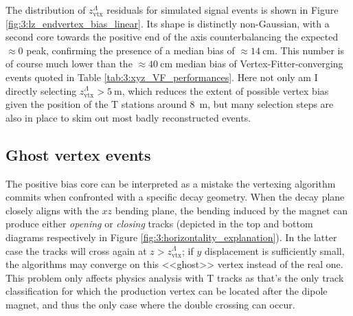 The distribution of $z_\text{vtx}^\Lambda$ residuals for simulated signal events is shown in Figure \ref{fig:3:lz_endvertex_bias_linear}.
Its shape is distinctly non-Gaussian, with a second core towards the positive end of the axis counterbalancing the expected $\approx 0$ peak, confirming the presence of a median bias of $\approx \SI{14}{\centi\meter}$. This number is of course much lower than the $\approx \SI{40}{\centi\meter}$ median bias of Vertex-Fitter-converging events quoted in Table \ref{tab:3:xyz_VF_performances}. Here not only am I directly selecting $z_\text{vtx}^\Lambda > \SI{5}{\meter}$, which reduces the extent of possible vertex bias given the position of the T stations around \SI{8}{\meter}, but many selection steps are also in place to skim out most badly reconstructed events.

\subsection{Ghost vertex events}
\label{sec:3:ghost_vertex}

The positive bias core can be interpreted as a mistake the vertexing algorithm commits when confronted with a specific decay geometry.
When the \lambdadecay decay plane closely aligns with the $xz$ bending plane, the bending induced by the magnet can produce either \textit{opening} or \textit{closing} tracks (depicted in the top and bottom diagrams respectively in Figure \ref{fig:3:horizontality_explanation}).
In the latter case the tracks will cross again at $z>z_\text{vtx}^\Lambda$;
if $y$ displacement is sufficiently small, the algorithms may converge on this <<ghost>> vertex instead of the real one.
This problem only affects physics analysis with T tracks as that's the only track classification for which the production vertex can be located after the dipole magnet, and thus the only case where the double crossing can occur.


